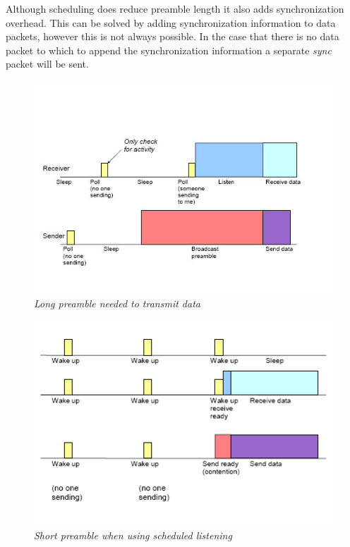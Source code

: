 Although scheduling does reduce preamble length it also adds synchronization
overhead. This can be solved by adding synchronization information to data
packets, however this is not always possible. In the case that there is no data
packet to which to append the synchronization information a separate
\emph{sync} packet will be sent.

\clearpage

\begin{figure}[ht]
	\begin{center}
		\includegraphics[scale=0.9]{img/scp_long_preambles.jpg}
	\end{center}
	\caption{\small \itshape{Long preamble needed to transmit
	data\protect\footnotemark}}
	\label{fig:scp_long_preambles}
\end{figure}

\begin{figure}[ht]
	\begin{center}
		\includegraphics[scale=0.9]{img/scp_short_preambles.jpg}
	\end{center}
	\caption{\small \itshape{Short preamble when using scheduled 
	listening\protect\footnotemark}}
	\label{fig:scp_short_preambles}
\end{figure}

